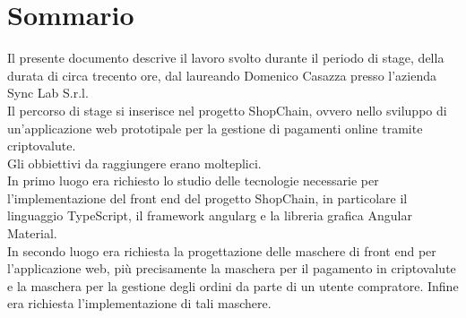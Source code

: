 \cleardoublepage
{}
{}
\begingroup
\let\clearpage\relax
\let\cleardoublepage\relax
\let\cleardoublepage\relax

\chapter*{Sommario}

Il presente documento descrive il lavoro svolto durante il periodo di stage, della durata di circa trecento ore, dal laureando Domenico Casazza presso l'azienda Sync Lab S.r.l.\\
Il percorso di stage si inserisce nel progetto ShopChain, ovvero nello sviluppo di un'applicazione web prototipale per la gestione di pagamenti online tramite criptovalute.\\
Gli obbiettivi da raggiungere erano molteplici.\\
In primo luogo era richiesto lo studio delle tecnologie necessarie per l'implementazione del front end del progetto ShopChain, in particolare il linguaggio TypeScript, il framework \gls{angularg} e la libreria grafica Angular Material.\\
In secondo luogo era richiesta la progettazione delle maschere di front end per l'applicazione web, più precisamente la maschera per il pagamento in criptovalute e la maschera per la gestione degli ordini da parte di un utente compratore.
Infine era richiesta l'implementazione di tali maschere.

%
%
\endgroup
\vfill